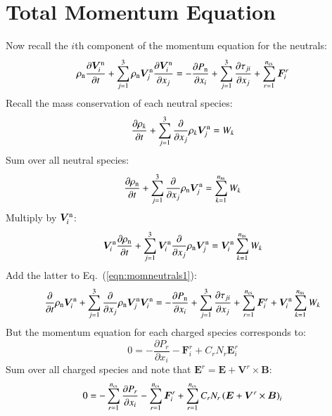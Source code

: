 \documentclass{warpdoc}
\newcommand{\nns}{{n_{\rm ns}}}
\newcommand{\ncs}{{n_{\rm cs}}}
\renewcommand{\vec}[1]{\bm{#1}}
\begin{document}
\section{Total Momentum Equation}


Now recall the $i$th component of the momentum equation for the neutrals:
%
\begin{equation}
  \rho_{\rm n} \frac{\partial \vec{V}_i^{\rm n} }{\partial t}+ \sum_{j=1}^3 \rho_{\rm n} \vec{V}_j^{\rm n} \frac{\partial \vec{V}_i^{\rm n}}{\partial x_j}
=
-\frac{\partial P_{\rm n}}{\partial x_i} 
+ \sum_{j=1}^3 \frac{\partial \tau_{ji}}{\partial x_j}
+ \sum_{r=1}^\ncs \vec{F}_i^r
\label{eqn:momneutrals1}
\end{equation}
%
Recall the mass conservation of each neutral species:
%
\begin{equation}
\frac{\partial \rho_k}{\partial t} + \sum_{j=1}^3 \frac{\partial}{\partial x_j} \rho_k \vec{V}^{\rm n}_j = W_k
\end{equation}
%
Sum over all neutral species:
%
\begin{equation}
\frac{\partial \rho_{\rm n}}{\partial t} + \sum_{j=1}^3 \frac{\partial}{\partial x_j} \rho_{\rm n} \vec{V}^{\rm n}_j = \sum_{k=1}^\nns W_k
\end{equation}
%
Multiply by $\vec{V}_i^{\rm n}$:
%
\begin{equation}
\vec{V}_i^{\rm n} \frac{\partial \rho_{\rm n}}{\partial t} + \sum_{j=1}^3 \vec{V}_i^{\rm n} \frac{\partial}{\partial x_j} \rho_{\rm n} \vec{V}^{\rm n}_j = \vec{V}_i^{\rm n} \sum_{k=1}^\nns  W_k
\end{equation}
%
Add the latter to Eq.\ (\ref{eqn:momneutrals1}):
%
\begin{equation}
   \frac{\partial  }{\partial t}\rho_{\rm n} \vec{V}_i^{\rm n}
  + \sum_{j=1}^3  \frac{\partial }{\partial x_j}\rho_{\rm n} \vec{V}_j^{\rm n} \vec{V}_i^{\rm n}
=
-\frac{\partial P_{\rm n}}{\partial x_i} 
+ \sum_{j=1}^3 \frac{\partial \tau_{ji}}{\partial x_j}
+ \sum_{r=1}^\ncs \vec{F}_i^r
+\vec{V}_i^{\rm n} \sum_{k=1}^\nns  W_k
\label{eqn:momneutrals2}
\end{equation}
%
But the momentum equation for each charged species corresponds to:
%
\begin{equation}
  0 = -\frac{\partial P_r}{\partial x_i} -\vec{F}_i^r + C_r N_r \vec{E}^r_i
\end{equation}
%
Sum over all charged species and note that $\vec{E}^r=\vec{E}+\vec{V}^r \times \vec{B}$:
%
\begin{equation}
  0 = -\sum_{r=1}^\ncs \frac{\partial P_r}{\partial x_i} - \sum_{r=1}^\ncs \vec{F}_i^r + \sum_{r=1}^\ncs C_r N_r \left(\vec{E}+\vec{V}^r \times \vec{B}\right)_i
\end{equation}
\end{document}
